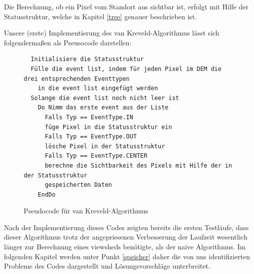 Die Berechnung, ob ein Pixel vom Standort aus sichtbar ist, erfolgt mit Hilfe der Statusstruktur, welche in Kapitel \ref{tree} genauer beschrieben 
ist.

Unsere (erste) Implementierung des van Kreveld-Algorithmus lässt sich folgendermaßen als Pseusocode darstellen:

\begin{figure}[!ht]
 \centering
 \begin{BVerbatim}
  Initialisiere die Statusstruktur 
  Fülle die event list, indem für jeden Pixel im DEM die drei entsprechenden Eventtypen 
    in die event list eingefügt werden  
  Solange die event list noch nicht leer ist 
    Do Nimm das erste event aus der Liste 
      Falls Typ == EventType.IN
	  füge Pixel in die Statusstruktur ein
      Falls Typ == EventType.OUT
	  lösche Pixel in der Statusstruktur 
      Falls Typ == EventType.CENTER
	  berechne die Sichtbarkeit des Pixels mit Hilfe der in der Statusstruktur 
	  gespeicherten Daten
    EndDo

 \end{BVerbatim}
 \caption{Pseudocode für van Kreveld-Algorithmus}
 \label{pseudo_krev}
\end{figure}

Nach der Implementierung dieses Codes zeigten bereits die ersten Testläufe, dass dieser Algorithmus trotz der angepriesenen Verbesserung der Laufzeit 
wesentlich länger zur Berechnung eines viewsheds benötigte, als der naive Algorithmus. Im folgenden Kapitel werden unter Punkt \ref{speicher} daher 
die von uns identifizierten Probleme des Codes dargestellt und Lösungsvorschläge unterbreitet. 

